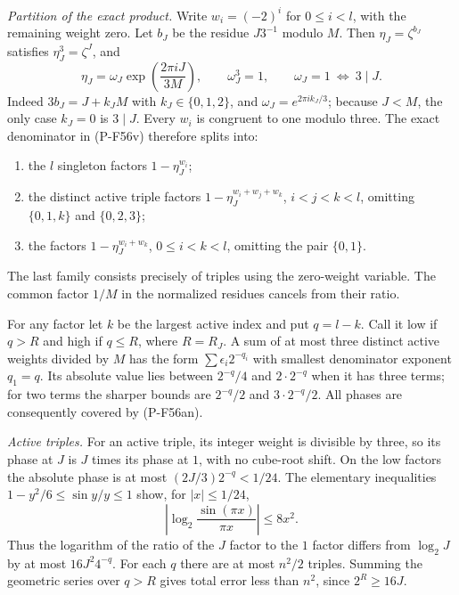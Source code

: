 \emph{Partition of the exact product.}
Write $w_i=(-2)^i$ for $0\le i<l$, with the remaining
weight zero. Let $b_J$ be the residue $J3^{-1}$ modulo
$M$. Then $\eta_J=\zeta^{b_J}$ satisfies
$\eta_J^3=\zeta^J$, and
\[
 \eta_J=\omega_J\exp\left(\frac{2\pi iJ}{3M}\right),
 \qquad \omega_J^3=1,
 \qquad \omega_J=1\ \Longleftrightarrow\ 3\mid J.
 \tag{P-F56ap}
\]
Indeed $3b_J=J+k_JM$ with $k_J\in\{0,1,2\}$, and
$\omega_J=e^{2\pi i k_J/3}$; because $J<M$, the only
case $k_J=0$ is $3\mid J$.
Every $w_i$ is congruent to one modulo three. The exact
denominator in (P-F56v) therefore splits into:
\begin{enumerate}
\item the $l$ singleton factors $1-\eta_J^{w_i}$;
\item the distinct active triple factors
      $1-\eta_J^{w_i+w_j+w_k}$, $i<j<k<l$,
      omitting $\{0,1,k\}$ and $\{0,2,3\}$;
\item the factors $1-\eta_J^{w_i+w_k}$,
      $0\le i<k<l$, omitting the pair $\{0,1\}$.
\end{enumerate}
The last family consists precisely of triples using the
zero-weight variable. The common factor $1/M$ in the
normalized residues cancels from their ratio.

For any factor let $k$ be the largest active index and put
$q=l-k$. Call it low if $q>R$ and high if $q\le R$,
where $R=R_J$. A sum of at most three distinct active
weights divided by $M$ has the form
$\sum\epsilon_i2^{-q_i}$ with smallest denominator
exponent $q_1=q$. Its absolute value lies between
$2^{-q}/4$ and $2\cdot2^{-q}$ when it has three terms;
for two terms the sharper bounds are
$2^{-q}/2$ and $3\cdot2^{-q}/2$.
All phases are consequently covered by (P-F56an).

\emph{Active triples.}
For an active triple, its integer weight is divisible
by three, so its phase at $J$ is $J$ times its phase
at $1$, with no cube-root shift. On the low factors
the absolute phase is at most
$(2J/3)2^{-q}<1/24$.
The elementary inequalities
$1-y^2/6\le\sin y/y\le1$ show, for $|x|\le1/24$,
\[
 \left|\log_2\frac{\sin(\pi x)}{\pi x}\right|
                                      \le8x^2.
\]
Thus the logarithm of the ratio of the $J$ factor to
the $1$ factor differs from $\log_2 J$ by at most
$16J^2 4^{-q}$. For each $q$ there are at most
$n^2/2$ triples. Summing the geometric series over
$q>R$ gives total error less than $n^2$, since
$2^R\ge16J$.

